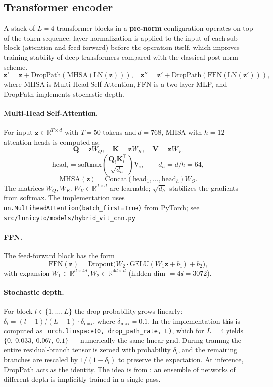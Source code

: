 \documentclass[14pt,a4paper]{extreport}
\begin{document}
\subsection{Transformer encoder}

A stack of $L=4$ transformer blocks in a \textbf{pre-norm}
configuration operates on top of the token sequence: layer normalization
is applied to the input of each sub-block (attention and feed-forward)
before the operation itself, which improves training stability of deep
transformers compared with the classical post-norm scheme.
\[
    \mathbf{z}' = \mathbf{z} + \text{DropPath}(\text{MHSA}(\text{LN}(\mathbf{z}))),
    \quad
    \mathbf{z}'' = \mathbf{z}' + \text{DropPath}(\text{FFN}(\text{LN}(\mathbf{z}'))),
\]
where MHSA is Multi-Head Self-Attention, FFN is a two-layer MLP, and
DropPath implements stochastic depth.

\paragraph{Multi-Head Self-Attention.} For input $\mathbf{z} \in
\mathbb{R}^{T \times d}$ with $T=50$ tokens and $d=768$, MHSA with
$h=12$ attention heads is computed as:
\[
    \mathbf{Q} = \mathbf{z} W_Q, \quad
    \mathbf{K} = \mathbf{z} W_K, \quad
    \mathbf{V} = \mathbf{z} W_V,
\]
\[
    \text{head}_i = \text{softmax}\!\left(
        \frac{\mathbf{Q}_i \mathbf{K}_i^{\top}}{\sqrt{d_h}}
    \right) \mathbf{V}_i,
    \qquad
    d_h = d / h = 64,
\]
\[
    \text{MHSA}(\mathbf{z}) = \text{Concat}(\text{head}_1, \ldots, \text{head}_h) W_O.
\]
The matrices $W_Q, W_K, W_V \in \mathbb{R}^{d \times d}$ are learnable;
$\sqrt{d_h}$ stabilizes the gradients from softmax. The implementation
uses \texttt{nn.MultiheadAttention(batch\_first=True)} from PyTorch; see
\texttt{src/lunicyto/models/hybrid\_vit\_cnn.py}.

\paragraph{FFN.} The feed-forward block has the form
\[
    \text{FFN}(\mathbf{z}) = \text{Dropout}\!\Big(
        W_2 \cdot \text{GELU}(W_1 \mathbf{z} + b_1) + b_2
    \Big),
\]
with expansion $W_1 \in \mathbb{R}^{d \times 4d}, W_2 \in \mathbb{R}^{4d
\times d}$ (hidden dim $= 4d = 3072$).

\paragraph{Stochastic depth.} For block $l \in \{1, \ldots, L\}$ the
drop probability grows linearly: $\delta_l = (l-1)/(L-1) \cdot
\delta_{\max}$, where $\delta_{\max} = 0.1$. In the implementation this
is computed as \texttt{torch.linspace(0, drop\_path\_rate, L)}, which
for $L=4$ yields $\{0,\ 0.033,\ 0.067,\ 0.1\}$ --- numerically the same
linear grid. During training the entire residual-branch tensor is zeroed
with probability $\delta_l$, and the remaining branches are rescaled by
$1/(1 - \delta_l)$ to preserve the expectation. At inference, DropPath
acts as the identity. The idea is from \cite{huang2016deep}: an ensemble
of networks of different depth is implicitly trained in a single pass.
\end{document}
